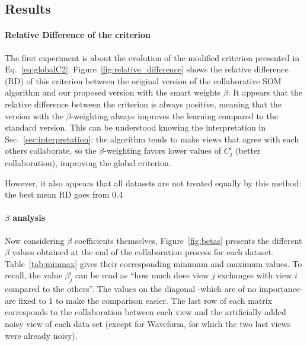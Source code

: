 \subsection{Results}


\paragraph{Relative Difference of the criterion}
The first experiment is about the evolution of the modified criterion presented in Eq.~\ref{eq:globalC2}. Figure~\ref{fig:relative_difference} shows the relative difference (RD) of this criterion between the original version of the collaborative SOM algorithm and our proposed version with the smart weights $\beta$. It appears that the relative difference between the criterion is always positive, meaning that the version with the $\beta$-weighting always improves the learning compared to the standard version. This can be understood knowing the interpretation in Sec.~\ref{sec:interpretation}: the algorithm tends to make views that agree with each others collaborate, so the $\beta$-weighting favors lower values of $C_j^i$ (better collaboration), improving the global criterion.

However, it also appears that all datasets are not treated equally by this method: the best mean RD goes from 0.4\

\paragraph{$\beta$ analysis}
Now considering $\beta$ coefficients themselves, Figure~\ref{fig:betas} presents the different $\beta$ values obtained at the end of the collaboration process for each dataset. Table~\ref{tab:minmax} gives their corresponding minimum and maximum values. To recall, the value $\beta_j^i$ can be read as ``how much does view $j$ exchanges with view $i$ compared to the others''. The values on the diagonal -which are of no importance- are fixed to 1 to make the comparison easier. The last row of each matrix corresponds to the collaboration between each view and the artificially added noisy view of each data set (except for Waveform, for which the two last views were already noisy). 


